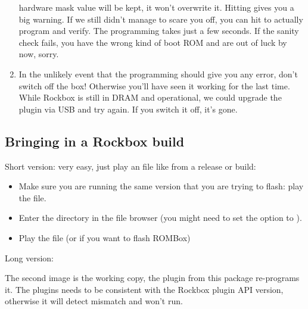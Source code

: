 \begin{enumerate}
  hardware mask value will be kept, it won't overwrite it. Hitting  gives you 
  a big warning. If we still didn't manage to scare you off, you can hit to actually program and verify. The programming takes just a few seconds. If 
  the sanity check fails, you have the wrong kind of boot ROM and are out of luck
  by now, sorry.
\item In the unlikely event that the programming should give you any error, don't
  switch off the box! Otherwise you'll have seen it working for the last time. 
  While Rockbox is still in DRAM and operational, we could upgrade the plugin via
  USB and try again. If you switch it off, it's gone.
\end{enumerate}



\subsection{Bringing in a Rockbox build}
Short version: very easy, just play an  file like 
 from a release or build:

\begin{itemize}
\item Make sure you are running the same version that you are trying to flash: 
  play the  file.
\item  Enter the  directory in the file browser (you might need 
  to set the  option to ).
\item Play the  file (or  if you want to 
  flash ROMBox)
\end{itemize}

Long version:

The second image is the working copy, the  plugin from
this package re-programs it. The plugins needs to be consistent with the Rockbox 
plugin API version, otherwise it will detect mismatch and won't run.

